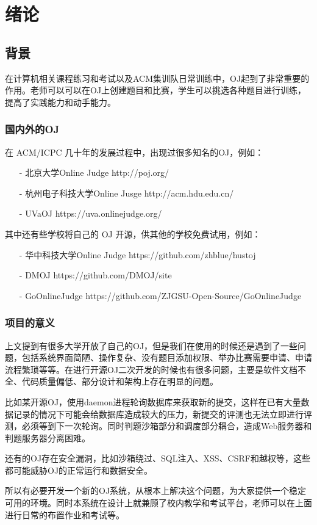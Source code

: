\section{绪论}

\subsection{背景}

在计算机相关课程练习和考试以及ACM集训队日常训练中，OJ起到了非常重要的作用。老师可以可以在OJ上创建题目和比赛，学生可以挑选各种题目进行训练，提高了实践能力和动手能力。

\subsubsection{国内外的OJ}

在 ACM/ICPC 几十年的发展过程中，出现过很多知名的OJ，例如：
\begin{itemize}
\item[-]北京大学Online Judge  http://poj.org/
\item[-]杭州电子科技大学Online Jusge  http://acm.hdu.edu.cn/
\item[-]UVaOJ  https://uva.onlinejudge.org/
\end{itemize}
其中还有些学校将自己的 OJ 开源，供其他的学校免费试用，例如：
\begin{itemize}
\item[-]华中科技大学Online Judge  https://github.com/zhblue/hustoj
\item[-]DMOJ  https://github.com/DMOJ/site
\item[-]GoOnlineJudge  https://github.com/ZJGSU-Open-Source/GoOnlineJudge
\end{itemize}

\subsubsection{项目的意义}

上文提到有很多大学开放了自己的OJ，但是我们在使用的时候还是遇到了一些问题，包括系统界面简陋、操作复杂、没有题目添加权限、举办比赛需要申请、申请流程繁琐等等。在进行开源OJ二次开发的时候也有很多问题，主要是软件文档不全、代码质量偏低、部分设计和架构上存在明显的问题。

比如某开源OJ，使用daemon进程轮询数据库来获取新的提交，这样在已有大量数据记录的情况下可能会给数据库造成较大的压力，新提交的评测也无法立即进行评测，必须等到下一次轮询。同时判题沙箱部分和调度部分耦合，造成Web服务器和判题服务器分离困难。

还有的OJ存在安全漏洞，比如沙箱绕过、SQL注入、XSS、CSRF和越权等，这些都可能威胁OJ的正常运行和数据安全。

所以有必要开发一个新的OJ系统，从根本上解决这个问题，为大家提供一个稳定可用的环境。同时本系统在设计上就兼顾了校内教学和考试平台，老师可以在上面进行日常的布置作业和考试等。